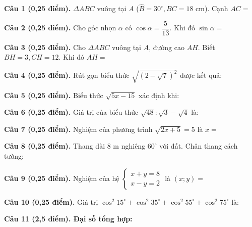 \documentclass[12pt,a4paper]{article}
\begin{document}
\vspace{1.2mm}
\noindent\textbf{Câu 1 (0,25 điểm).} $\Delta ABC$ vuông tại $A$ ($\widehat{B}=30^\circ, BC=18\text{ cm}$). Cạnh $AC =$ \par\vspace{0.6mm}
\noindent\textbf{Câu 2 (0,25 điểm).} Cho góc nhọn $\alpha$ có $\cos \alpha = \dfrac{5}{13}$. Khi đó $\sin \alpha =$ \par\vspace{0.6mm}
\noindent\textbf{Câu 3 (0,25 điểm).} Cho $\Delta ABC$ vuông tại $A$, đường cao $AH$. Biết $BH=3, CH=12$. Khi đó $AH =$ \par\vspace{0.6mm}
\noindent\textbf{Câu 4 (0,25 điểm).} Rút gọn biểu thức $\sqrt{(2 - \sqrt{7})^2}$ được kết quả: \par\vspace{0.6mm}
\noindent\textbf{Câu 5 (0,25 điểm).} Biểu thức $\sqrt{5x - 15}$ xác định khi: \par\vspace{0.6mm}
\noindent\textbf{Câu 6 (0,25 điểm).} Giá trị của biểu thức $\sqrt{48} : \sqrt{3} - \sqrt{4}$ là: \par\vspace{0.6mm}
\noindent\textbf{Câu 7 (0,25 điểm).} Nghiệm của phương trình $\sqrt{2x + 5} = 5$ là $x =$ \par\vspace{0.6mm}
\noindent\textbf{Câu 8 (0,25 điểm).} Thang dài $8\text{ m}$ nghiêng $60^\circ$ với đất. Chân thang cách tường: \par\vspace{0.6mm}
\noindent\textbf{Câu 9 (0,25 điểm).} Nghiệm của hệ $\begin{cases} x + y = 8 \\ x - y = 2 \end{cases}$ là $(x; y) =$ \par\vspace{0.6mm}
\noindent\textbf{Câu 10 (0,25 điểm).} Giá trị $\cos^2 15^\circ + \cos^2 35^\circ + \cos^2 55^\circ + \cos^2 75^\circ$ là: \par\vspace{0.6mm}
\vspace{0.8mm}
\noindent\textbf{Câu 11 (2,5 điểm). Đại số tổng hợp:}
\vspace{0.6mm}
\end{document}
